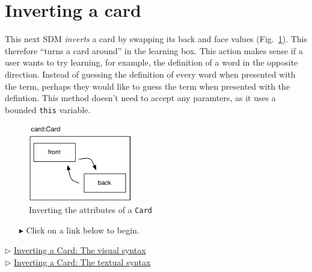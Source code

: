 \newpage
\section{Inverting a card}
\genHeader
\hypertarget{sec:invertCard}{}

This next SDM \emph{inverts} a card by swapping its back and face values (Fig.~\ref{fig:goal_invert}). This therefore ``turns a card around'' in the learning
box. This action makes sense if a user wants to try learning, for example, the definition of a word in the opposite direction. Instead of guessing the
definition of every word when presented with the term, perhaps they would like to guess the term when presented with the defintion. This method doesn't need to
accept any paramters, as it uses a bounded \texttt{this} variable.

\vspace{0.5cm}

\begin{figure}[htbp]
	\centering
    \includegraphics[width=0.4\textwidth]{invert.pdf}
 	\caption{Inverting the attributes of a \texttt{Card}}
 	\label{fig:goal_invert}
\end{figure}
\FloatBarrier

\vspace{0.5cm}
\begin{itemize}
\item[$\blacktriangleright$] Click on a link below to begin.
\end{itemize}

\begin{center}{$\triangleright$ \hyperlink{invertCard vis}{Inverting a Card: The visual syntax}}%
\\ \vspace{0.5cm}
{$\triangleright$ \hyperlink{invertCard tex}{Inverting a Card: The textual syntax}} \end{center} 





